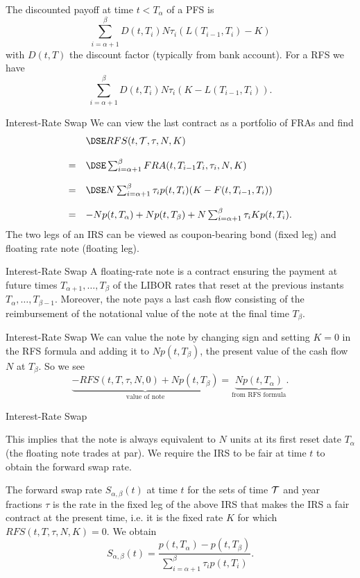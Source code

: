 The discounted payoff at time $t<T_{\alpha}$ of a PFS is
$$
\sum_{i=\alpha+1}^{\beta}D(t,T_i)N\tau_i(L(T_{i-1},T_i)-K)
$$
with $D(t,T)$ the discount factor (typically from bank account).
For a RFS we have
$$
\sum_{i=\alpha+1}^{\beta}D(t,T_i)N\tau_i(K-L(T_{i-1},T_i)).
$$

{Interest-Rate Swap}
We
can view the last contract as a portfolio of FRAs and find
$$
\begin{array}{ll}
& \DSE RFS(t,{\cal T},\tau,N,K) \\*[12pt] = & \DSE \sum_{i=\alpha+1}^{\beta}FRA(t,T_{i-1}T_i,\tau_i,N,K) \\*[12pt]
= & \DSE N\sum_{i=\alpha+1}^{\beta}\tau_i p(t,T_i)(K-F(t,T_{i-1},T_i))\\*[12pt]
= & -N   p(t,T_{\alpha})+Np(t,T_{\beta})+N\sum_{i=\alpha+1}^{\beta}\tau_i Kp(t,T_i).
\end{array}
$$
The two legs of an IRS can be viewed as
coupon-bearing bond (fixed leg) and floating rate note (floating
leg).

{Interest-Rate Swap}
A floating-rate note is a
contract ensuring the payment at future times
$T_{\alpha+1},\ldots,T_{\beta}$ of the LIBOR rates that reset at the previous instants
$T_{\alpha},\ldots,T_{\beta-1}$. Moreover, the note pays a last
cash flow consisting of the reimbursement of the notational value
of the note at the final time $T_{\beta}$.

{Interest-Rate Swap}
We can value the note by changing sign and setting $K=0$ in the
RFS formula and adding it to $Np(t,T_{\beta})$, the present value
of the cash flow $N$ at $T_{\beta}$. So we see
$$
\underbrace{-RFS(t,T,\tau,N,0)+Np(t,T_{\beta})}_{\mbox{value of note}}=
\underbrace{Np(t,T_{\alpha})}_{\mbox{from RFS formula}}.
$$

{Interest-Rate Swap}

This implies that the note is always equivalent to $N$ units at
its first reset date $T_{\alpha}$ (the floating note trades at
par). We require the IRS to be fair at time $t$ to obtain the
forward swap rate.

The forward swap rate $S_{\alpha,\beta}(t)$ at time $t$ for the
sets of time $\cal T$ and year fractions $\tau$ is the rate in the
fixed leg of the above IRS that makes the IRS a fair contract at
the present time, i.e. it is the fixed rate $K$ for which
$RFS(t,T,\tau,N,K)=0$. We obtain
\begin{equation}\label{FSR-1}
S_{\alpha,\beta}(t)=\frac{p(t,T_{\alpha})-p(t,T_{\beta})}{\sum_{i=\alpha+1}^{\beta}\tau_ip(t,T_i)}.
\end{equation}

